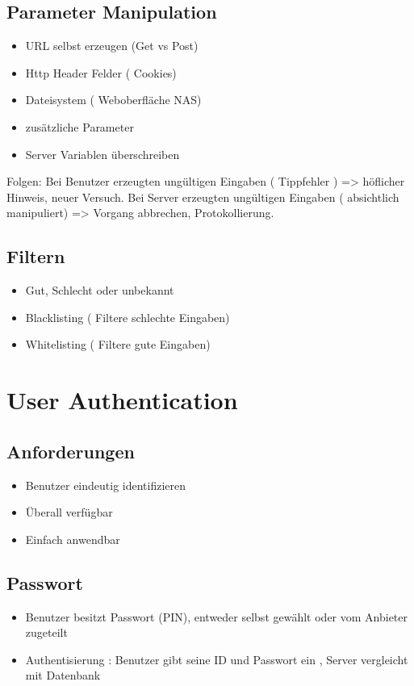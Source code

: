 \subsection*{ Parameter Manipulation}
\begin{itemize}
	\item URL selbst erzeugen (Get vs Post)
	\item Http Header Felder ( Cookies)
	\item Dateisystem ( Weboberfläche NAS)
	\item zusätzliche Parameter
	\item Server Variablen überschreiben
\end{itemize}
Folgen: 
Bei Benutzer erzeugten ungültigen Eingaben ( Tippfehler ) => höflicher Hinweis, neuer Versuch.
Bei Server erzeugten ungültigen Eingaben ( absichtlich manipuliert) => Vorgang abbrechen, Protokollierung.
\subsection*{ Filtern}
\begin{itemize}
	\item Gut, Schlecht oder unbekannt
	\item Blacklisting ( Filtere schlechte Eingaben)
	\item Whitelisting ( Filtere gute Eingaben)
\end{itemize}


\section*{User Authentication}
\subsection*{ Anforderungen}
\begin{itemize}
	\item Benutzer eindeutig identifizieren
	\item Überall verfügbar 
	\item Einfach anwendbar
\end{itemize}
\subsection*{ Passwort}
\begin{itemize}
	\item Benutzer besitzt Passwort (PIN), entweder selbst gewählt oder vom Anbieter zugeteilt
	\item Authentisierung : Benutzer gibt seine ID und Passwort ein , Server vergleicht mit Datenbank
\end{itemize}

